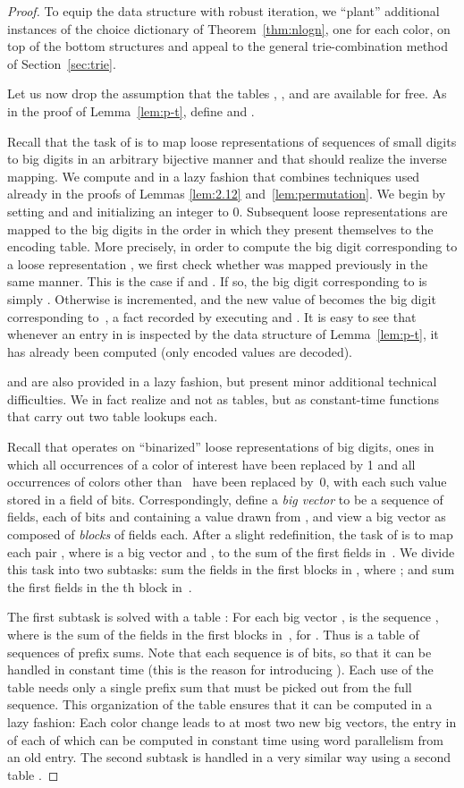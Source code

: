 \documentclass[envcountsame,envcountsect,undated,nolinenumbers]{lnthi}
\begin{document}
\begin{proof}
To equip the data structure with robust iteration,
we ``plant''  additional
instances of the choice dictionary of
Theorem~\ref{thm:nlogn}, one for each
color, on top of the bottom structures and
appeal to the general
trie-combination method of Section~\ref{sec:trie}.

Let us now drop the assumption that the
tables , , 
and  are available for free.
As in the proof of Lemma~\ref{lem:p-t},
define  and .

Recall that
the task of  is to
map loose representations of sequences of
 small digits to big digits in an arbitrary
bijective manner and that 
should realize the inverse mapping.
We compute  and 
in a lazy fashion that combines techniques
used already in the proofs of
Lemmas \ref{lem:2.12} and~\ref{lem:permutation}.
We begin by setting 
and  and initializing
an integer  to 0.
Subsequent loose representations are mapped to
the big digits  in the order in which
they present themselves to the encoding table.
More precisely, in order to compute
the big digit corresponding
to a loose representation , we first check
whether  was mapped previously in the same manner.
This is the case if 
and .
If so, the big digit corresponding to 
is simply .
Otherwise  is incremented, and the new
value of  becomes the big digit corresponding
to~, a fact recorded by executing
 and
.
It is easy to see that whenever an entry in
 is inspected by the data
structure of Lemma~\ref{lem:p-t}, it
has already been computed
(only encoded values are decoded).

 and  are also
provided in a lazy fashion, but present minor
additional technical difficulties.
We in fact realize  and 
not as tables, but as constant-time functions
that carry out two table lookups each.

Recall that  operates on ``binarized'' loose
representations of big digits, ones in which
all occurrences of a color  of interest have been
replaced by 1 and all occurrences of colors other than~
have been replaced by~0, with each such value stored
in a field of  bits.
Correspondingly, define a \emph{big vector} to be
a sequence of  fields, each of 
bits and containing a value drawn from ,
and view a big vector as composed of 
\emph{blocks} of  fields each.
After a slight redefinition, the task of 
is to map each pair , where  is a big
vector and , to the
sum of the  first fields in~.
We divide this task into two subtasks:
sum the fields in the first  blocks in ,
where ;
and sum the first 
fields in the th block in~.

The first subtask is solved with a table :
For each big vector ,  is the
sequence , where  is the
sum of the fields in the  first blocks in~,
for .
Thus  is a table of sequences of prefix sums.
Note that each sequence is of
 bits, so that it can be handled
in constant time
(this is the reason for introducing ).
Each use of the table needs only a single prefix sum that
must be picked out from the full sequence.
This organization of the table ensures that it can be
computed in a lazy fashion:
Each color change leads to at most two new big vectors,
the entry in  of each of which can be
computed in constant time using word parallelism
from an old entry.
The second subtask is handled in a very similar way
using a second table .


\end{proof}
\end{document}
